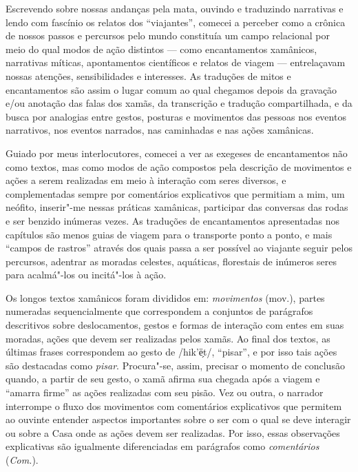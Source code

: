 Escrevendo sobre nossas andanças pela mata, ouvindo e traduzindo
narrativas e lendo com fascínio os relatos dos ``viajantes'', comecei a
perceber como a crônica de nossos passos e percursos pelo mundo
constituía um campo relacional por meio do qual modos de ação distintos
--- como encantamentos xamânicos, narrativas míticas, apontamentos
científicos e relatos de viagem --- entrelaçavam nossas atenções,
sensibilidades e interesses. As traduções de mitos e encantamentos são
assim o lugar comum ao qual chegamos depois da gravação e/ou anotação
das falas dos xamãs, da transcrição e tradução compartilhada, e da busca
por analogias entre gestos, posturas e movimentos das pessoas nos
eventos narrativos, nos eventos narrados, nas caminhadas e nas ações
xamânicas.

Guiado por meus interlocutores, comecei a ver as exegeses de
encantamentos não como textos, mas como modos de ação compostos pela
descrição de movimentos e ações a serem realizadas em meio à interação
com seres diversos, e complementadas sempre por comentários explicativos
que permitiam a mim, um neófito, inserir"-me nessas práticas xamânicas,
participar das conversas das rodas e ser benzido inúmeras vezes. As
traduções de encantamentos apresentadas nos capítulos são menos guias de
viagem para o transporte ponto a ponto, e mais ``campos de rastros''
através dos quais passa a ser possível ao viajante seguir pelos
percursos, adentrar as moradas celestes, aquáticas, florestais de
inúmeros seres para acalmá"-los ou incitá"-los à ação.

Os longos textos xamânicos foram divididos em: \emph{movimentos} (mov.),
partes numeradas sequencialmente que correspondem a conjuntos de
parágrafos descritivos sobre deslocamentos, gestos e formas de interação
com entes em suas moradas, ações que devem ser realizadas pelos xamãs.
Ao final dos textos, as últimas frases correspondem ao gesto de
/hik'ë̗t/, ``pisar'', e por isso tais ações são destacadas como
\emph{pisar}. Procura"-se, assim, precisar o momento de conclusão quando,
a partir de seu gesto, o xamã afirma sua chegada após a viagem e
``amarra firme'' as ações realizadas com seu pisão. Vez ou outra, o
narrador interrompe o fluxo dos movimentos com comentários explicativos
que permitem ao ouvinte entender aspectos importantes sobre o ser com o
qual se deve interagir ou sobre a Casa onde as ações devem ser
realizadas. Por isso, essas observações explicativas são igualmente
diferenciadas em parágrafos como \emph{comentários} (\emph{Com.}).

